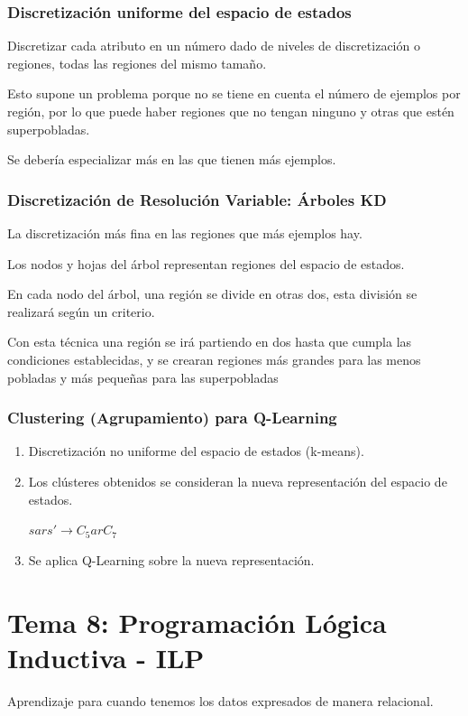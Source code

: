 \documentclass[12pt, twoside, openright]{report} %
\begin{document}
\subsection{Discretización uniforme del espacio de estados}
Discretizar cada atributo en un número dado de niveles de discretización o regiones, todas las regiones del mismo tamaño.

Esto supone un problema porque no se tiene en cuenta el número de ejemplos por región, por lo que puede haber regiones que no tengan ninguno y otras que estén superpobladas.

Se debería especializar más en las que tienen más ejemplos.

\subsection{Discretización de Resolución Variable: Árboles KD}
La discretización más fina en las regiones que más ejemplos hay.

Los nodos y hojas del árbol representan regiones del espacio de estados.

En cada nodo del árbol, una región se divide en otras dos, esta división se realizará según un criterio.

Con esta técnica una región se irá partiendo en dos hasta que cumpla las condiciones establecidas, y se crearan regiones más grandes para las menos pobladas y más pequeñas para las superpobladas

\subsection{Clustering (Agrupamiento) para Q-Learning}
\begin{enumerate}
	\item Discretización no uniforme del espacio de estados (k-means).
	\item Los clústeres obtenidos se consideran la nueva representación del espacio de estados.

	      $sars' \rightarrow C_5arC_7$
	\item Se aplica Q-Learning sobre la nueva representación.
\end{enumerate}

\chapter{Tema 8: Programación Lógica Inductiva - ILP}
Aprendizaje para cuando tenemos los datos expresados de manera relacional.
\end{document}
